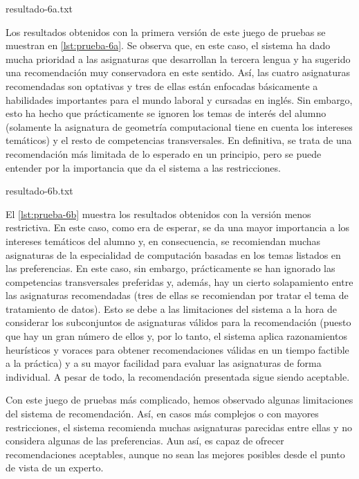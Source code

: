 %
    {resultado-6a.txt}

Los resultados obtenidos con la primera versión de este juego de pruebas se 
muestran en \autoref{lst:prueba-6a}. Se observa que, en este caso, el sistema 
ha dado mucha prioridad a las asignaturas que desarrollan la tercera lengua 
y ha sugerido una recomendación muy conservadora en este sentido. Así, las 
cuatro asignaturas recomendadas son optativas y tres de ellas están enfocadas 
básicamente a habilidades importantes para el mundo laboral y cursadas en 
inglés. Sin embargo, esto ha hecho que prácticamente se ignoren los temas de 
interés del alumno (solamente la asignatura de geometría computacional tiene 
en cuenta los intereses temáticos) y el resto de competencias transversales.
En definitiva, se trata de una recomendación más limitada de lo esperado en 
un principio, pero se puede entender por la importancia que da el sistema a 
las restricciones.

%
    {resultado-6b.txt}

El \autoref{lst:prueba-6b} muestra los resultados obtenidos con la versión 
menos restrictiva. En este caso, como era de esperar, se da una mayor 
importancia a los intereses temáticos del alumno y, en consecuencia, se 
recomiendan muchas asignaturas de la especialidad de computación basadas en 
los temas listados en las preferencias. En este caso, sin embargo, 
prácticamente se han ignorado las competencias transversales preferidas y, 
además, hay un cierto solapamiento entre las asignaturas recomendadas (tres de 
ellas se recomiendan por tratar el tema de tratamiento de datos).
Esto se debe a las limitaciones del sistema a la hora de considerar los 
subconjuntos de asignaturas válidos para la recomendación (puesto que hay un 
gran número de ellos y, por lo tanto, el sistema aplica razonamientos 
heurísticos y voraces para obtener recomendaciones válidas en un tiempo 
factible a la práctica) y a su mayor facilidad para evaluar las asignaturas de 
forma individual. A pesar de todo, la recomendación presentada sigue siendo 
aceptable.

Con este juego de pruebas más complicado, hemos observado algunas limitaciones 
del sistema de recomendación. Así, en casos más complejos o con mayores 
restricciones, el sistema recomienda muchas asignaturas parecidas entre ellas 
y no considera algunas de las preferencias. Aun así, es capaz de ofrecer 
recomendaciones aceptables, aunque no sean las mejores posibles desde el punto 
de vista de un experto.



